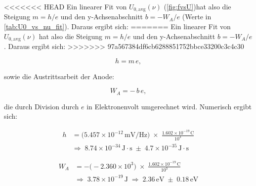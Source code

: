 \begin{table}[H]
\centering
{}
\caption{Ergebnisse des gewichteten linearen $\mathrm{\chi}^2$-Fits von $\overline{U_0}$ gegen $\nu$.}
\label{tab:U0_vs_nu_fit}
\end{table}
\FloatBarrier

<<<<<<< HEAD
Ein linearer Fit von $U_{0,\mathrm{avg}}(\nu)$ (\cref{fig:fvsU})hat also die Steigung $m = h/e$ und den y-Achsenabschnitt $b = -W_{A}/e$ (Werte in \cref{tab:U0_vs_nu_fit}). Daraus ergibt sich:
=======
Ein linearer Fit von $U_{0,\mathrm{avg}}(\nu)$ hat also die Steigung $m = h/e$ und den y-Achsenabschnitt $b = -W_{A}/e$. Daraus ergibt sich:
>>>>>>> 97a567384df6cb6288851752bbce33200c3c4c30


\begin{equation}
  h = m\,e,
\end{equation}

sowie die Austrittsarbeit der Anode:

\begin{equation}
  W_{A} = -\,b\,e,
\end{equation}

die durch Division durch $e$ in Elektronenvolt umgerechnet wird. Numerisch ergibt sich:

\begin{equation}
\begin{split}
  h &= \bigl(5.457\times10^{-12}\,\mathrm{mV/Hz}\bigr)\;\times\;\frac{1.602\times10^{-19}\,\mathrm{C}}{10^3}\\
    &\Longrightarrow\;8.74\times10^{-34}\,\mathrm{J\cdot s}\;\pm\;4.7\times10^{-35}\,\mathrm{J\cdot s}
\end{split}
\end{equation}

\begin{equation}
\begin{split}
  W_{A} &= -\bigl(-2.360\times10^{3}\bigr)\;\times\;\frac{1.602\times10^{-19}\,\mathrm{C}}{10^3}\\
        &\Longrightarrow\;3.78\times10^{-19}\,\mathrm{J}
         \;\Longrightarrow\;2.36\,\mathrm{eV}\;\pm\;0.18\,\mathrm{eV}
\end{split}
\end{equation}

